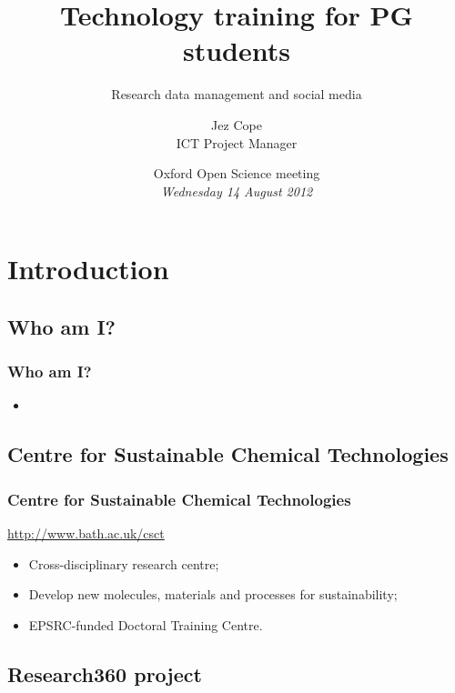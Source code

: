 \documentclass{beamer}
\title{Technology training for PG students}
\subtitle{Research data management and social media}
\author[Jez Cope]{Jez Cope\\ ICT Project Manager}
\institute[Bath]{Centre for Sustainable Chemical Technologies\\ University of Bath}
\date[14 August 2012]{Oxford Open Science meeting\\ \textit{Wednesday 14 August 2012}}
\begin{document}

\begin{frame}[plain]
  \titlepage
\end{frame}

\begin{frame}
  \tableofcontents
\end{frame}

\section{Introduction}

\subsection{Who am I?}

\begin{frame}
  \frametitle{Who am I?}
  
  \begin{itemize}
    \item 
  \end{itemize}
\end{frame}

\subsection{Centre for Sustainable Chemical Technologies}

\begin{frame}
  \frametitle{Centre for Sustainable Chemical Technologies}

  \begin{center}
    \Large\url{http://www.bath.ac.uk/csct}
  \end{center}
  
  \begin{itemize}
    \item Cross-disciplinary research centre;
    \item Develop new molecules, materials and processes for sustainability;
    \item EPSRC-funded Doctoral Training Centre.
  \end{itemize}
\end{frame}

\subsection{Research360 project}
\end{document}
